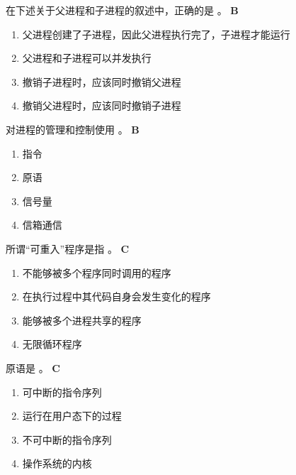 \begin{problem}
	在下述关于父进程和子进程的叙述中，正确的是 \myline。
	\textbf{B}
		\begin{enumerate}[label=\Alph*.]
			\item 父进程创建了子进程，因此父进程执行完了，子进程才能运行
			\item 父进程和子进程可以并发执行
			\item 撤销子进程时，应该同时撤销父进程
			\item 撤销父进程时，应该同时撤销子进程
		\end{enumerate}
\end{problem}


\begin{problem}
	对进程的管理和控制使用 \myline。
	\textbf{B}
	\vspace{-0.5em}
	\begin{multicols}{4}
		\begin{enumerate}[label=\Alph*.]
			\item 指令
			\item 原语
			\item 信号量
			\item 信箱通信
		\end{enumerate}
	\end{multicols}
	\vspace{-1em}
\end{problem}


\begin{problem}
	所谓“可重入”程序是指 \myline。
	\textbf{C}
	\vspace{-0.5em}
	\begin{multicols}{2}
		\begin{enumerate}[label=\Alph*.]
			\item 不能够被多个程序同时调用的程序
			\item 在执行过程中其代码自身会发生变化的程序
			\item 能够被多个进程共享的程序
			\item 无限循环程序
		\end{enumerate}
	\end{multicols}
	\vspace{-1em}
\end{problem}


\begin{problem}
	原语是 \myline。
	\textbf{C}
	\vspace{-0.5em}
	\begin{multicols}{2}
		\begin{enumerate}[label=\Alph*.]
			\item 可中断的指令序列
			\item 运行在用户态下的过程
			\item 不可中断的指令序列
			\item 操作系统的内核
		\end{enumerate}
	\end{multicols}
	\vspace{-1em}
\end{problem}


